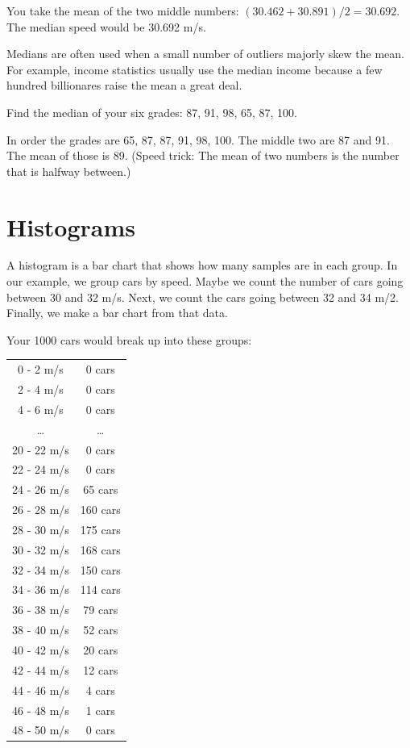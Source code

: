 You take the mean of the two middle numbers: $(30.462 + 30.891)/2 =
30.692$. The median speed would be 30.692 m/s.

Medians are often used when a small number of outliers majorly skew the
mean. For example, income statistics usually use the median income
because a few hundred billionares raise the mean a great deal.

\begin{Exercise}[title={Median Grade}, label=grades_median]

  Find the median of your six grades: 87, 91, 98, 65, 87, 100.

\end{Exercise}
\begin{Answer}[ref=grades_median]

  In order the grades are 65, 87, 87, 91, 98, 100.  The middle two are 87
  and 91. The mean of those is 89. (Speed trick: The mean of two numbers is the
  number that is halfway between.)
  
 \end{Answer}


\section{Histograms}

A histogram is a bar chart that shows how many samples are in each
group. In our example, we group cars by speed. Maybe we count the
number of cars going between 30 and 32 m/s. Next, we count the
cars going between 32 and 34 m/2. Finally, we make a bar chart from
that data.

Your 1000 cars would break up into these groups:

\begin{tabular}{ c | c }
0 - 2 m/s & 0 cars \\
2 - 4 m/s & 0 cars \\
4 - 6 m/s & 0 cars \\
\ldots & \ldots \\
20 - 22 m/s & 0 cars \\
22 - 24 m/s & 0 cars \\
24 - 26 m/s & 65 cars \\
26 - 28 m/s & 160 cars \\
28 - 30 m/s & 175 cars \\
30 - 32 m/s & 168 cars \\
32 - 34 m/s & 150 cars \\
34 - 36 m/s & 114 cars \\
36 - 38 m/s & 79 cars \\
38 - 40 m/s & 52 cars \\
40 - 42 m/s & 20 cars \\
42 - 44 m/s & 12 cars \\
44 - 46 m/s & 4 cars \\
46 - 48 m/s & 1 cars \\
48 - 50 m/s & 0 cars \\
\end{tabular}

